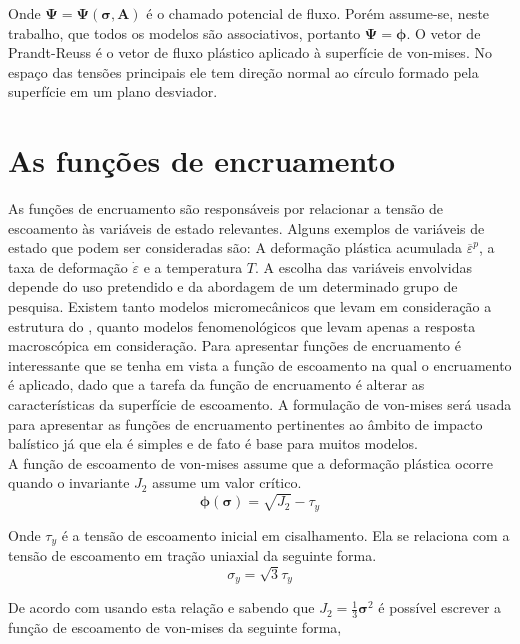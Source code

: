 Onde $\boldsymbol{\Psi} = \boldsymbol{\Psi}(\boldsymbol{\sigma}, \boldsymbol{A}) $ é o chamado potencial de fluxo. Porém assume-se, neste trabalho, que todos os modelos são associativos, portanto $ \boldsymbol{\Psi} = \boldsymbol{\phi} $. O vetor de Prandt-Reuss é o vetor de fluxo plástico aplicado à superfície de von-mises. No espaço das tensões principais ele tem direção normal ao círculo formado pela superfície em um plano desviador.

\section{As funções de encruamento}

As funções de encruamento são responsáveis por relacionar a tensão de escoamento às variáveis de estado relevantes. Alguns exemplos de variáveis de estado que podem ser consideradas são: A deformação plástica acumulada $ \overline{\varepsilon}^p $, a taxa de deformação $ \dot{\varepsilon} $ e a temperatura $ T $. A escolha das variáveis envolvidas depende do uso pretendido e da abordagem de um determinado grupo de pesquisa. Existem tanto modelos micromecânicos que levam em consideração a estrutura do , quanto modelos fenomenológicos que levam apenas a resposta macroscópica em consideração. Para apresentar funções de encruamento é interessante que se tenha em vista a função de escoamento na qual o encruamento é aplicado, dado que a tarefa da função de encruamento é alterar as características da superfície de escoamento. A formulação de von-mises será usada para apresentar as funções de encruamento pertinentes ao âmbito de impacto balístico já que ela é simples e de fato é base para muitos modelos. \\

A função de escoamento de von-mises assume que a deformação plástica ocorre quando o invariante $ J_2 $ assume um valor crítico.
\begin{equation} \label{eq:vonesc}
    \boldsymbol{\phi}(\boldsymbol{\sigma}) = \sqrt{J_2} - \tau_y
\end{equation}

Onde $ \tau_y $ é a tensão de escoamento inicial em cisalhamento. Ela se relaciona com a tensão de escoamento em tração uniaxial da seguinte forma.
\begin{equation}
    \sigma_y = \sqrt{3}\tau_y
\end{equation}

De acordo com \cite{neto_peric_owens_2008} usando esta relação e sabendo que 
$ J_2 = \frac{1}{3}\boldsymbol{\sigma}^2 $
é possível escrever a função de escoamento de von-mises da seguinte forma,

